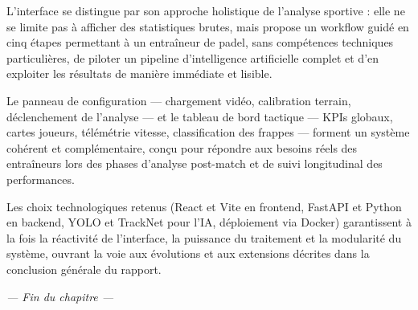 L'interface se distingue par son approche holistique de l'analyse sportive : elle ne se
limite pas à afficher des statistiques brutes, mais propose un workflow guidé en cinq étapes
permettant à un entraîneur de padel, sans compétences techniques particulières, de piloter
un pipeline d'intelligence artificielle complet et d'en exploiter les résultats de manière
immédiate et lisible.
 
Le panneau de configuration — chargement vidéo, calibration terrain, déclenchement de
l'analyse — et le tableau de bord tactique — KPIs globaux, cartes joueurs, télémétrie
vitesse, classification des frappes — forment un système cohérent et complémentaire, conçu
pour répondre aux besoins réels des entraîneurs lors des phases d'analyse post-match et de
suivi longitudinal des performances.
 
Les choix technologiques retenus (React et Vite en frontend, FastAPI et Python en backend,
YOLO et TrackNet pour l'IA, déploiement via Docker) garantissent à la fois la réactivité de
l'interface, la puissance du traitement et la modularité du système, ouvrant la voie aux
évolutions et aux extensions décrites dans la conclusion générale du rapport.
 
\bigskip
\begin{center}
  \textit{— Fin du chapitre —}
\end{center}
